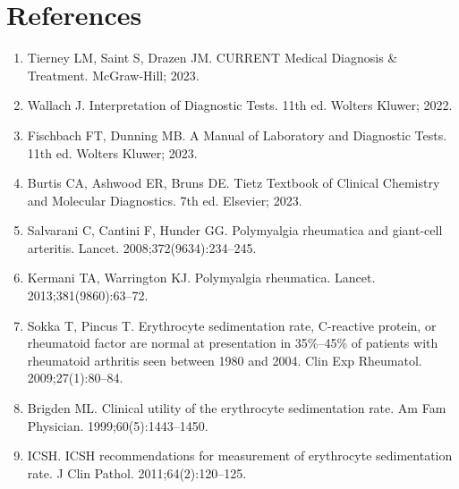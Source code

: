 \section*{References}
\begin{enumerate}
  \item Tierney LM, Saint S, Drazen JM. CURRENT Medical Diagnosis \& Treatment. McGraw-Hill; 2023.
  \item Wallach J. Interpretation of Diagnostic Tests. 11th ed. Wolters Kluwer; 2022.
  \item Fischbach FT, Dunning MB. A Manual of Laboratory and Diagnostic Tests. 11th ed. Wolters Kluwer; 2023.
  \item Burtis CA, Ashwood ER, Bruns DE. Tietz Textbook of Clinical Chemistry and Molecular Diagnostics. 7th ed. Elsevier; 2023.
  \item Salvarani C, Cantini F, Hunder GG. Polymyalgia rheumatica and giant-cell arteritis. Lancet. 2008;372(9634):234--245.
  \item Kermani TA, Warrington KJ. Polymyalgia rheumatica. Lancet. 2013;381(9860):63--72.
  \item Sokka T, Pincus T. Erythrocyte sedimentation rate, C-reactive protein, or rheumatoid factor are normal at presentation in 35\%--45\% of patients with rheumatoid arthritis seen between 1980 and 2004. Clin Exp Rheumatol. 2009;27(1):80--84.
  \item Brigden ML. Clinical utility of the erythrocyte sedimentation rate. Am Fam Physician. 1999;60(5):1443--1450.
  \item ICSH. ICSH recommendations for measurement of erythrocyte sedimentation rate. J Clin Pathol. 2011;64(2):120--125.
\end{enumerate}

\clearpage
